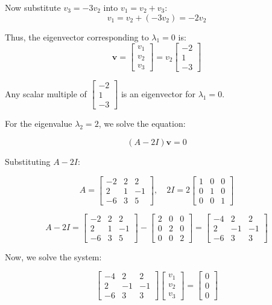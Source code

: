 \documentclass[11pt]{exam}
\begin{document}
\begin{questions}
\begin{parts}
Now substitute \( v_3 = -3v_2 \) into \( v_1 = v_2 + v_3 \):
\[
v_1 = v_2 + (-3v_2) = -2v_2
\]

Thus, the eigenvector corresponding to \( \lambda_1 = 0 \) is:
\[
\mathbf{v} = \begin{bmatrix} v_1 \\ v_2 \\ v_3 \end{bmatrix} = v_2 \begin{bmatrix} -2 \\ 1 \\ -3 \end{bmatrix}
\]

Any scalar multiple of \( \begin{bmatrix} -2 \\ 1 \\ -3 \end{bmatrix} \) is an eigenvector for \( \lambda_1 = 0 \).

For the eigenvalue \( \lambda_2 = 2 \), we solve the equation:

\[
(A - 2I) \mathbf{v} = 0
\]

Substituting \( A - 2I \):

\[
A = \begin{bmatrix}
-2 & 2 & 2 \\
2 & 1 & -1 \\
-6 & 3 & 5
\end{bmatrix}, \quad 2I = 2 \begin{bmatrix}
1 & 0 & 0 \\
0 & 1 & 0 \\
0 & 0 & 1
\end{bmatrix}
\]

\[
A - 2I = \begin{bmatrix}
-2 & 2 & 2 \\
2 & 1 & -1 \\
-6 & 3 & 5
\end{bmatrix} - \begin{bmatrix}
2 & 0 & 0 \\
0 & 2 & 0 \\
0 & 0 & 2
\end{bmatrix} = \begin{bmatrix}
-4 & 2 & 2 \\
2 & -1 & -1 \\
-6 & 3 & 3
\end{bmatrix}
\]

Now, we solve the system:

\[
\begin{bmatrix}
-4 & 2 & 2 \\
2 & -1 & -1 \\
-6 & 3 & 3
\end{bmatrix}
\begin{bmatrix}
v_1 \\
v_2 \\
v_3
\end{bmatrix}
= 
\begin{bmatrix}
0 \\
0 \\
0
\end{bmatrix}
\]


\end{parts}
\end{questions}
\end{document}
